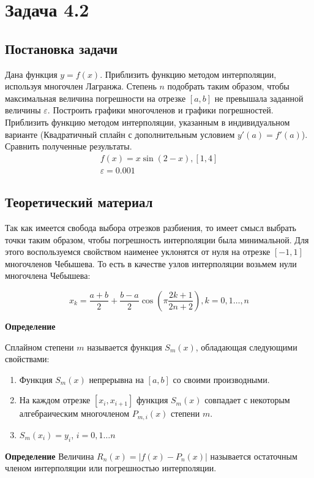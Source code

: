 \section*{Задача 4.2}
\subsection*{Постановка задачи}

Дана функция $y = f(x)$. Приблизить функцию методом интерполяции, используя многочлен Лагранжа. Степень $n$ подобрать таким образом, чтобы максимальная величина погрешности на отрезке $[a, b]$ не превышала заданной величины $\varepsilon$. Построить графики многочленов и графики погрешностей. Приблизить функцию методом интерполяции, указанным в индивидуальном варианте (Квадратичный сплайн с дополнительным условием $y'(a) = f'(a)$). Сравнить полученные результаты.
\begin{gather}
	f(x) = x\sin{(2 - x)}, [1, 4] \\
	\varepsilon = 0.001
\end{gather}
	
\subsection*{Теоретический материал}



Так как имеется свобода выбора отрезков разбиения, то имеет смысл выбрать точки таким образом, чтобы погрешность интерполяции была минимальной. Для этого воспользуемся свойством наименее уклонятся от нуля на отрезке $[-1, 1]$ многочленов Чебышева. То есть в качестве узлов интерполяции возьмем нули многочлена Чебышева:

\[
	x_k = \dfrac{a + b}{2} + \dfrac{b - a}{2}\cos{\left(\pi\dfrac{2k + 1}{2n + 2}\right)}, k = 0, 1\dots, n
\]

\textbf{Определение}{
	Сплайном степени $m$ называется функция $S_m(x)$, обладающая следующими свойствами:
	\begin{enumerate}
		\item Функция $S_m(x)$ непрерывна на $[a, b]$ со своими производными.
		\item На каждом отрезке $[x_i, x_{i+1}]$ функция $S_m(x)$ совпадает с некоторым алгебраическим многочленом $P_{m, i}(x)$ степени $m$.
		\item $S_m(x_i) = y_i$, $i = 0, 1\dots n$
	\end{enumerate}
}

\textbf{Определение}{
	Величина $R_n(x) = |f(x) - P_n(x)|$ называется остаточным членом
интерполяции или погрешностью интерполяции.
}

